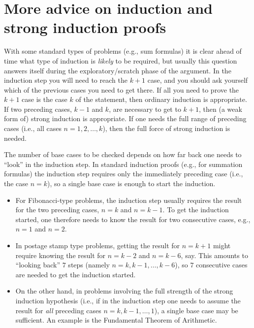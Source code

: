 \section{More advice on  induction and strong induction proofs}

\noindent
{}
With some standard types of problems (e.g., sum formulas) 
it is clear ahead of time what type of induction is \emph{likely} to be
required, but usually this question answers itself during 
the exploratory/scratch phase of the argument. In the induction step you
will need to reach the $k+1$ case, and you should ask yourself which of
the previous cases you need to get there. If all you need to prove the
$k+1$ case is the case $k$ of the statement, then ordinary induction is
appropriate. If two preceding cases, $k-1$ and $k$, are necessary to get
to $k+1$, then (a weak form of) strong induction is appropriate. If one
needs the full range of preceding cases (i.e., all cases
$n=1,2,\dots,k$), then the full force of strong induction is needed.


\noindent
{} 
The number of base cases to be checked depends on how far back one needs to
``look'' in the induction step. In standard induction proofs (e.g., for summation
formulas) the induction step requires only the immediately preceding case (i.e., the
case $n=k$), so a single base case is enough to start the induction.   
\begin{itemize}
\item 
For Fibonacci-type problems, 
the induction step usually requires the result for the two preceding cases,
$n=k$ and $n=k-1$. To get the induction started, one therefore needs to know 
the result for two consecutive cases, e.g., $n=1$ and $n=2$. 
\item 
In postage stamp type problems, getting the result for
$n=k+1$  might require knowing the result for $n=k-2$ and  
$n=k-6$, say. This amounts to ``looking back'' $7$ steps  (namely
$n=k,k-1,\dots,k-6$), so $7$ consecutive cases are needed to get the
induction started.
\item 
On the other hand, in problems involving the full strength of the strong
induction hypothesis (i.e., if in the induction step one needs to assume the
result for \emph{all} preceding cases $n=k,k-1,\dots,1$),  a single base
case may be sufficient.  An example is the Fundamental Theorem of
Arithmetic.
\end{itemize}

